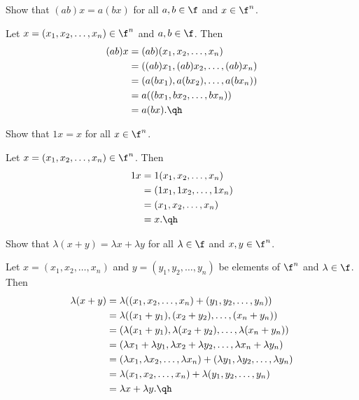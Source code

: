 \begin{exercise}[1a12]
    Show that $(ab)x = a(bx)$ for all $a, b \in \f$ and $x \in \f^n$.
\end{exercise}

\begin{sol}
    Let $x = (x_1, x_2, \ldots, x_n) \in \f^n$ and $a, b \in \f$. Then
    \begin{align*}
        (ab)x & = (ab)(x_1, x_2, \ldots, x_n) \\
        & = ( (ab)x_1, (ab)x_2, \ldots, (ab)x_n ) \\
        & = ( a(bx_1), a(bx_2), \ldots, a(bx_n) ) \\
        & = a( (bx_1, bx_2, \ldots, bx_n) ) \\
        & = a(bx). \qh
    \end{align*}
\end{sol}

\begin{exercise}[1a13]
    Show that $1x = x$ for all $x \in \f^n$.

\end{exercise}

\begin{sol}
    Let $x = (x_1, x_2, \ldots, x_n) \in \f^n$. Then
    \begin{align*}
        1x & = 1(x_1, x_2, \ldots, x_n) \\
        & = (1x_1, 1x_2, \ldots, 1x_n) \\
        & = (x_1, x_2, \ldots, x_n) \\
        & = x. \qh
    \end{align*}
\end{sol}

\begin{exercise}[1a14]
    Show that $\lambda(x + y) = \lambda x + \lambda y$ for all $\lambda \in \f$ and $x, y \in \f^n$.
\end{exercise}

\begin{sol}
    Let $x = (x_1, x_2, \ldots, x_n)$ and $y = (y_1, y_2, \ldots, y_n)$ be elements of $\f^n$ and $\lambda \in \f$. Then
    \begin{align*}
        \lambda(x + y) & = \lambda((x_1, x_2, \ldots, x_n) + (y_1, y_2, \ldots, y_n)) \\
        & = \lambda((x_1 + y_1), (x_2 + y_2), \ldots, (x_n + y_n)) \\
        & = (\lambda(x_1 + y_1), \lambda(x_2 + y_2), \ldots, \lambda(x_n + y_n)) \\
        & = (\lambda x_1 + \lambda y_1, \lambda x_2 + \lambda y_2, \ldots, \lambda x_n + \lambda y_n) \\
        & = (\lambda x_1, \lambda x_2, \ldots, \lambda x_n) + (\lambda y_1, \lambda y_2, \ldots, \lambda y_n) \\
        & = \lambda(x_1, x_2, \ldots, x_n) + \lambda(y_1, y_2, \ldots, y_n) \\
        & = \lambda x + \lambda y. \qh
    \end{align*}
\end{sol}

